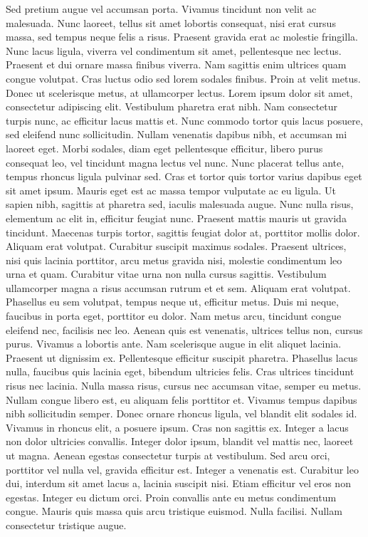 \documentclass[a4paper]{memoir}
\begin{document}
Sed pretium augue vel accumsan porta. Vivamus tincidunt non velit ac malesuada. Nunc laoreet, tellus sit amet lobortis consequat, nisi erat cursus massa, sed tempus neque felis a risus. Praesent gravida erat ac molestie fringilla. Nunc lacus ligula, viverra vel condimentum sit amet, pellentesque nec lectus. Praesent et dui ornare massa finibus viverra. Nam sagittis enim ultrices quam congue volutpat. Cras luctus odio sed lorem sodales finibus. Proin at velit metus. Donec ut scelerisque metus, at ullamcorper lectus.
Lorem ipsum dolor sit amet, consectetur adipiscing elit. Vestibulum pharetra erat nibh. Nam consectetur turpis nunc, ac efficitur lacus mattis et. Nunc commodo tortor quis lacus posuere, sed eleifend nunc sollicitudin. Nullam venenatis dapibus nibh, et accumsan mi laoreet eget. Morbi sodales, diam eget pellentesque efficitur, libero purus consequat leo, vel tincidunt magna lectus vel nunc. Nunc placerat tellus ante, tempus rhoncus ligula pulvinar sed. Cras et tortor quis tortor varius dapibus eget sit amet ipsum. Mauris eget est ac massa tempor vulputate ac eu ligula.
Ut sapien nibh, sagittis at pharetra sed, iaculis malesuada augue. Nunc nulla risus, elementum ac elit in, efficitur feugiat nunc. Praesent mattis mauris ut gravida tincidunt. Maecenas turpis tortor, sagittis feugiat dolor at, porttitor mollis dolor. Aliquam erat volutpat. Curabitur suscipit maximus sodales. Praesent ultrices, nisi quis lacinia porttitor, arcu metus gravida nisi, molestie condimentum leo urna et quam.
Curabitur vitae urna non nulla cursus sagittis. Vestibulum ullamcorper magna a risus accumsan rutrum et et sem. Aliquam erat volutpat. Phasellus eu sem volutpat, tempus neque ut, efficitur metus. Duis mi neque, faucibus in porta eget, porttitor eu dolor. Nam metus arcu, tincidunt congue eleifend nec, facilisis nec leo. Aenean quis est venenatis, ultrices tellus non, cursus purus. Vivamus a lobortis ante. Nam scelerisque augue in elit aliquet lacinia. Praesent ut dignissim ex. Pellentesque efficitur suscipit pharetra. Phasellus lacus nulla, faucibus quis lacinia eget, bibendum ultricies felis. Cras ultrices tincidunt risus nec lacinia. Nulla massa risus, cursus nec accumsan vitae, semper eu metus. Nullam congue libero est, eu aliquam felis porttitor et. Vivamus tempus dapibus nibh sollicitudin semper.
Donec ornare rhoncus ligula, vel blandit elit sodales id. Vivamus in rhoncus elit, a posuere ipsum. Cras non sagittis ex. Integer a lacus non dolor ultricies convallis. Integer dolor ipsum, blandit vel mattis nec, laoreet ut magna. Aenean egestas consectetur turpis at vestibulum. Sed arcu orci, porttitor vel nulla vel, gravida efficitur est. Integer a venenatis est. Curabitur leo dui, interdum sit amet lacus a, lacinia suscipit nisi. Etiam efficitur vel eros non egestas. Integer eu dictum orci. Proin convallis ante eu metus condimentum congue. Mauris quis massa quis arcu tristique euismod. Nulla facilisi. Nullam consectetur tristique augue.
\end{document}
